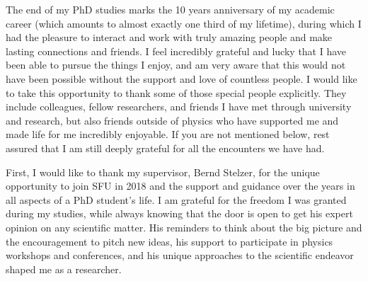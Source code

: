 The end of my PhD studies marks the 10 years anniversary of my academic career (which amounts to almost exactly one third of my lifetime), during which I had the pleasure to interact and work with truly amazing people and make lasting connections and friends.
I feel incredibly grateful and lucky that I have been able to pursue the things I enjoy, and am very aware that this would not have been possible without the support and love of countless people. 
I would like to take this opportunity to thank some of those special people explicitly.
They include colleagues, fellow researchers, and friends I have met through university and research, but also friends outside of physics who have supported me and made life for me incredibly enjoyable. 
If you are not mentioned below, rest assured that I am still deeply grateful for all the encounters we have had.

First, I would like to thank my supervisor, Bernd Stelzer, for the unique opportunity to join SFU in 2018 and the support and guidance over the years in all aspects of a PhD student's life. 
I am grateful for the freedom I was granted during my studies, while always knowing that the door is open to get his expert opinion on any scientific matter.
His reminders to think about the big picture and the encouragement to pitch new ideas, his support to participate in physics workshops and conferences, and his unique approaches to the scientific endeavor shaped me as a researcher. 

